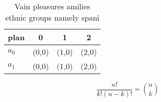 \documentclass[a4paper]{article}
\begin{document}
\begin{table}
\begin{adjustbox}{width=0.6\columnwidth}
\begin{tabular}{|l|l|l|l|}
\hline
\textbf{plan} & \multicolumn{1}{c|}{\textbf{0}} & \multicolumn{1}{c|}{\textbf{1}} & \multicolumn{1}{c|}{\textbf{2}} \\ \hline
\textbf{$a_0$}  & (0,0) & (1,0) & (2,0) \\ \hline
\textbf{$a_1$}  & (0,0) & (1,0) & (2,0) \\ \hline
\end{tabular}
\end{adjustbox}
\caption{Vain pleasures amilies ethnic groups namely spani
}
\end{table}

\[ \frac{n!}{k!(n-k)!} = \binom{n}{k} \]
\end{document}
